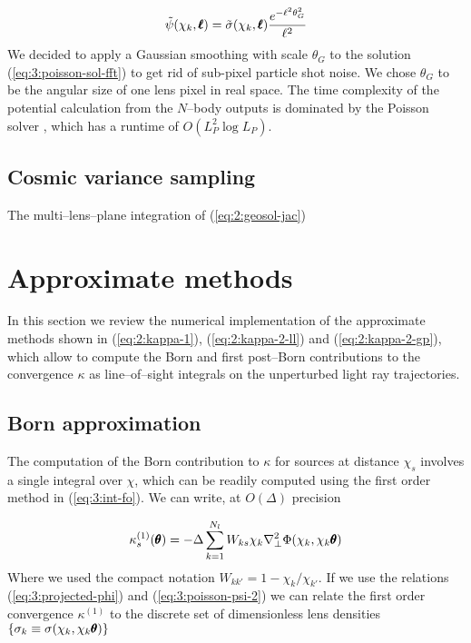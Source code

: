 \begin{equation}
\label{eq:3:poisson-sol-fft}
\tilde{\psi}(\chi_k,\pmb{\ell}) = \tilde{\sigma}(\chi_k,\pmb{\ell})\frac{e^{-\ell^2\theta_G^2}}{\ell^2}
\end{equation} 
%
We decided to apply a Gaussian smoothing with scale $\theta_G$ to the solution (\ref{eq:3:poisson-sol-fft}) to get rid of sub-pixel particle shot noise. We chose $\theta_G$ to be the angular size of one lens pixel in real space. The time complexity of the potential calculation from the $N$--body outputs is dominated by the Poisson solver \citep{lenstools}, which has a runtime of $O(L_P^2\log L_P)$.

\subsection{Cosmic variance sampling}
The multi--lens--plane integration of (\ref{eq:2:geosol-jac})


\section{Approximate methods}
In this section we review the numerical implementation of the approximate methods shown in (\ref{eq:2:kappa-1}), (\ref{eq:2:kappa-2-ll}) and (\ref{eq:2:kappa-2-gp}), which allow to compute the Born and first post--Born contributions to the convergence $\kappa$ as line--of--sight integrals on the unperturbed light ray trajectories. 

\subsection{Born approximation}
The computation of the Born contribution to $\kappa$ for sources at distance $\chi_s$ involves a single integral over $\chi$, which can be readily computed using the first order method in (\ref{eq:3:int-fo}). We can write, at $O(\Delta)$ precision 

\begin{equation}
\label{eq:3:kappa-fo-num-1}
\kappa^{(1)}_s(\pmb{\theta}) = -\Delta\sum_{k=1}^{N_l} W_{ks}\chi_k\nabla^2_\perp\Phi(\chi_k,\chi_k\pmb{\theta})
\end{equation} 
%
Where we used the compact notation $W_{kk'}=1-\chi_k/\chi_{k'}$. If we use the relations (\ref{eq:3:projected-phi}) and (\ref{eq:3:poisson-psi-2}) we can relate the first order convergence $\kappa^{(1)}$ to the discrete set of dimensionless lens densities $\{\sigma_k\equiv\sigma(\chi_k,\chi_k\pmb{\theta})\}$

